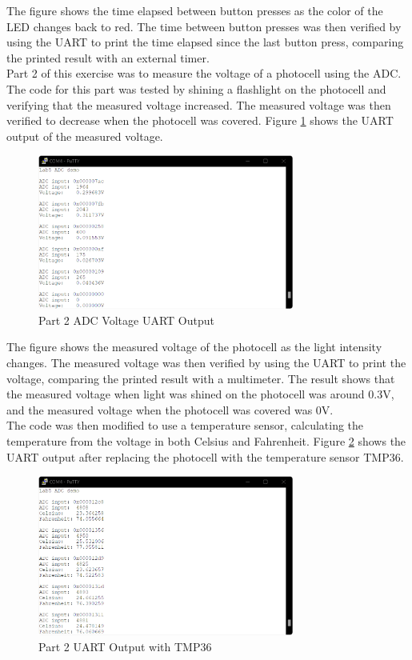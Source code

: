 \documentclass[CMPE]{KGCOEReport}
\begin{document}
The figure shows the time elapsed between button presses as the color of the LED changes back to red. The time between button presses was then verified by using the UART to print the time elapsed since the last button press, comparing the printed result with an external timer.\\

Part 2 of this exercise was to measure the voltage of a photocell using the ADC. The code for this part was tested by shining a flashlight on the photocell and verifying that the measured voltage increased. The measured voltage was then verified to decrease when the photocell was covered. Figure \ref{fig:part2a} shows the UART output of the measured voltage.

\begin{figure}[H]
    \centering
    \includegraphics[width=0.75\textwidth]{part2a.png}
    \caption{Part 2 ADC Voltage UART Output}
    \label{fig:part2a}
\end{figure}

The figure shows the measured voltage of the photocell as the light intensity changes. The measured voltage was then verified by using the UART to print the voltage, comparing the printed result with a multimeter. The result shows that the measured voltage when light was shined on the photocell was around 0.3V, and the measured voltage when the photocell was covered was 0V.\\

The code was then modified to use a temperature sensor, calculating the temperature from the voltage in both Celsius and Fahrenheit. Figure \ref{fig:part2b} shows the UART output after replacing the photocell with the temperature sensor TMP36.

\begin{figure}[H]
    \centering
    \includegraphics[width=0.75\textwidth]{part2b.png}
    \caption{Part 2 UART Output with TMP36}
    \label{fig:part2b}
\end{figure}
\end{document}
